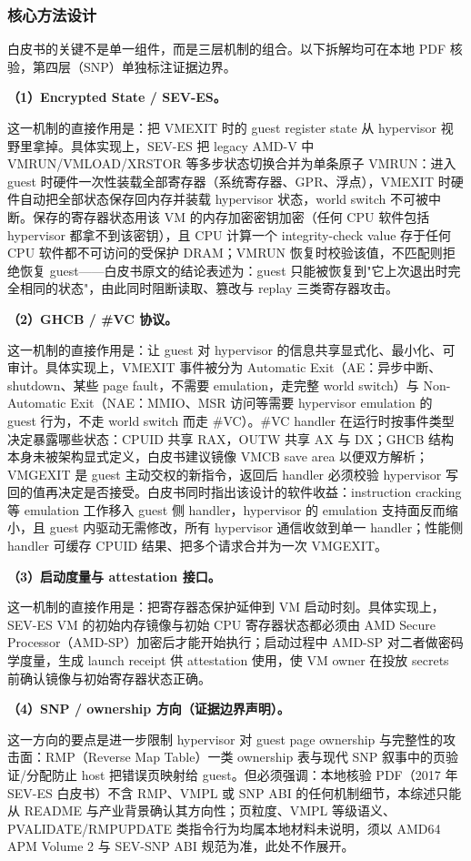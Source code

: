 \documentclass[11pt]{ctexart}
\begin{document}
\subsubsection{核心方法设计}
白皮书的关键不是单一组件，而是三层机制的组合。以下拆解均可在本地 PDF 核验，第四层（SNP）单独标注证据边界。\par
\noindent\textbf{（1）Encrypted State / SEV-ES。}\par
这一机制的直接作用是：把 VMEXIT 时的 guest register state 从 hypervisor 视野里拿掉。具体实现上，SEV-ES 把 legacy AMD-V 中 VMRUN/VMLOAD/XRSTOR 等多步状态切换合并为单条原子 VMRUN：进入 guest 时硬件一次性装载全部寄存器（系统寄存器、GPR、浮点），VMEXIT 时硬件自动把全部状态保存回内存并装载 hypervisor 状态，world switch 不可被中断。保存的寄存器状态用该 VM 的内存加密密钥加密（任何 CPU 软件包括 hypervisor 都拿不到该密钥），且 CPU 计算一个 integrity-check value 存于任何 CPU 软件都不可访问的受保护 DRAM；VMRUN 恢复时校验该值，不匹配则拒绝恢复 guest——白皮书原文的结论表述为：guest 只能被恢复到"它上次退出时完全相同的状态"，由此同时阻断读取、篡改与 replay 三类寄存器攻击。\par
\noindent\textbf{（2）GHCB / \#VC 协议。}\par
这一机制的直接作用是：让 guest 对 hypervisor 的信息共享显式化、最小化、可审计。具体实现上，VMEXIT 事件被分为 Automatic Exit（AE：异步中断、shutdown、某些 page fault，不需要 emulation，走完整 world switch）与 Non-Automatic Exit（NAE：MMIO、MSR 访问等需要 hypervisor emulation 的 guest 行为，不走 world switch 而走 \#VC）。\#VC handler 在运行时按事件类型决定暴露哪些状态：CPUID 共享 RAX，OUTW 共享 AX 与 DX；GHCB 结构本身未被架构显式定义，白皮书建议镜像 VMCB save area 以便双方解析；VMGEXIT 是 guest 主动交权的新指令，返回后 handler 必须校验 hypervisor 写回的值再决定是否接受。白皮书同时指出该设计的软件收益：instruction cracking 等 emulation 工作移入 guest 侧 handler，hypervisor 的 emulation 支持面反而缩小，且 guest 内驱动无需修改，所有 hypervisor 通信收敛到单一 handler；性能侧 handler 可缓存 CPUID 结果、把多个请求合并为一次 VMGEXIT。\par
\noindent\textbf{（3）启动度量与 attestation 接口。}\par
这一机制的直接作用是：把寄存器态保护延伸到 VM 启动时刻。具体实现上，SEV-ES VM 的初始内存镜像与初始 CPU 寄存器状态都必须由 AMD Secure Processor（AMD-SP）加密后才能开始执行；启动过程中 AMD-SP 对二者做密码学度量，生成 launch receipt 供 attestation 使用，使 VM owner 在投放 secrets 前确认镜像与初始寄存器状态正确。\par
\noindent\textbf{（4）SNP / ownership 方向（证据边界声明）。}\par
这一方向的要点是进一步限制 hypervisor 对 guest page ownership 与完整性的攻击面：RMP（Reverse Map Table）一类 ownership 表与现代 SNP 叙事中的页验证/分配防止 host 把错误页映射给 guest。但必须强调：本地核验 PDF（2017 年 SEV-ES 白皮书）不含 RMP、VMPL 或 SNP ABI 的任何机制细节，本综述只能从 README 与产业背景确认其方向性；页粒度、VMPL 等级语义、PVALIDATE/RMPUPDATE 类指令行为均属本地材料未说明，须以 AMD64 APM Volume 2 与 SEV-SNP ABI 规范为准，此处不作展开。\par
\end{document}
